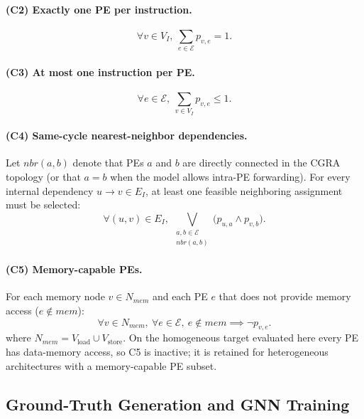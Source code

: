 \documentclass[runningheads]{llncs}
\begin{document}
\paragraph{(C2) Exactly one PE per instruction.}
\begin{equation}
    \forall v \in V_I,\ \sum_{e \in \mathcal{E}} p_{v,e} = 1.
\end{equation}

\paragraph{(C3) At most one instruction per PE.}
\begin{equation}
    \forall e \in \mathcal{E},\ \sum_{v \in V_I} p_{v,e} \leq 1.
\end{equation}

\paragraph{(C4) Same-cycle nearest-neighbor dependencies.}
Let $\mathit{nbr}(a,b)$ denote that PEs $a$ and $b$ are directly connected in the CGRA topology (or that $a = b$ when the model allows intra-PE forwarding). For every internal dependency $u \rightarrow v \in E_I$, at least one feasible neighboring assignment must be selected:
\begin{equation}
    \forall (u,v) \in E_I,\
    \bigvee_{\substack{a,b \in \mathcal{E} \\ \mathit{nbr}(a,b)}}
    \bigl( p_{u,a} \wedge p_{v,b} \bigr).
\end{equation}

\paragraph{(C5) Memory-capable PEs.}
For each memory node $v \in N_{\mathit{mem}}$ and each PE $e$ that does not provide memory access ($e \notin \mathit{mem}$):
\begin{equation}
    \forall v \in N_{\mathit{mem}},\ \forall e \in \mathcal{E},\
    e \notin \mathit{mem} \implies \neg p_{v,e}.
\end{equation}
where $N_{\mathit{mem}} = V_{\text{load}} \cup V_{\text{store}}$. On the homogeneous target evaluated here every PE has data-memory access, so C5 is inactive; it is retained for heterogeneous architectures with a memory-capable PE subset.

\subsection{Ground-Truth Generation and GNN Training}
%
\end{document}
